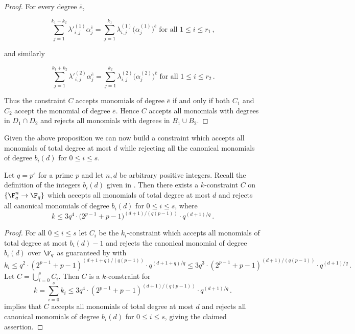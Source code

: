 \begin{proof}
For every degree $\overline e$,

\[\sum_{j=1}^{k_1+k_2} \lambda'^{(1)}_{i,j} \alpha_j^{\overline e} =  \sum_{j=1}^{k_1} \lambda^{(1)}_{i,j} \big(\alpha^{(1)}_j\big)^{\overline e} \; \text{for all $1 \leq i \leq r_1$}\,, \]

and similarly

\[\sum_{j=1}^{k_1+k_2} \lambda'^{(2)}_{i,j} \alpha_j^{\overline e} =  \sum_{j=1}^{k_2} \lambda^{(2)}_{i,j} \big(\alpha^{(2)}_j\big)^{\overline e} \; \text{for all $1 \leq i \leq r_2$}\,.\]

Thus the constraint $C$ accepts monomials of degree $\overline e$ if and only if both $C_1$ and $C_2$ accept the monomial of degree $\overline e$.
Hence $C$ accepts all monomials with degrees in $D_1 \cap D_2$ and rejects
all monomials with degrees in $B_1 \cup B_2$.
\end{proof}



Given the above proposition we can now build a constraint which
accepts all monomials of total degree at most $d$ while rejecting
all the canonical monomials of degree $b_i(d)$ for $0 \leq i \leq s$.

\begin{lemma}
\label{lem:canonical-monomial-single-orbit}
Let $q=p^s$ for a prime $p$ and let $n, d$ be arbitrary positive integers. Recall the definition of the integers $b_i(d)$ given in .
Then there exists a $k$-constraint $C$ on $\{\F_q^n \to \F_q\}$
which accepts all monomials
of total degree at most $d$ and rejects all canonical
monomials of degree $b_i(d)$ for $0 \leq i \leq s$, where
\[k \leq 3q^4 \cdot \big(2^{p-1}+p-1\big)^{(d+1)/(q(p-1))} \cdot q^{(d+1)/q}\,.\]
\end{lemma}


\begin{proof}
For all $0 \leq i \leq s$ let $C_i$ be the $k_i$-constraint which accepts all monomials of total degree at most $b_i(d)-1$
and
rejects the canonical monomial of degree $b_i(d)$ over $\F_q$ as guaranteed by 
with $$k_i \leq q^2  \cdot (2^{p-1}+p-1)^{(d+1+q)/(q(p-1))} \cdot q^{(d+1+q)/q} \leq 3q^3 \cdot (2^{p-1}+p-1)^{(d+1)/(q(p-1))} \cdot q^{(d+1)/q}\,.$$
Let $C = \bigcup_{i=0}^{s}C_i$. Then $C$ is a $k$-constraint for $$k = \sum_{i=0}^{s} k_i \leq 3q^4 \cdot (2^{p-1}+p-1)^{(d+1)/(q(p-1))} \cdot q^{(d+1)/q}\,.$$
 implies that $C$ accepts all monomials of total degree at most $d$ and rejects all canonical monomials
of degree $b_i(d)$ for $0 \leq i \leq s$, giving the claimed assertion.
\end{proof}





